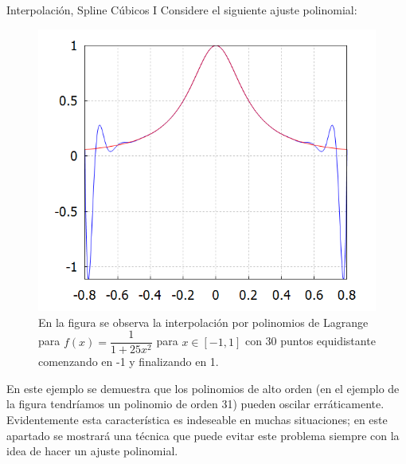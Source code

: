 \begin{frame}{Interpolación, Spline Cúbicos I}
\indent Considere el siguiente ajuste polinomial:
\begin{multicols}{2}
\begin{figure}[H]
\includegraphics[scale=0.6]{Imagen21}
\caption{\scriptsize En la figura se observa la interpolación por polinomios de Lagrange para $f(x)=\dfrac{1}{1+25x^2}$ para $x\in[-1,1]$ con 30 puntos equidistante comenzando en -1 y finalizando en 1.}
\end{figure}
En este ejemplo se demuestra que los polinomios de alto orden (en el ejemplo de la figura tendríamos un polinomio de orden 31)  pueden oscilar erráticamente. Evidentemente esta característica es indeseable en muchas situaciones; en este apartado se mostrará una técnica que puede evitar este problema siempre con la idea de hacer un ajuste polinomial.
\end{multicols}
\end{frame}
